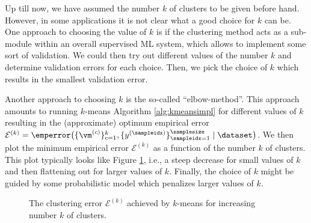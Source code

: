 \documentclass[12pt]{report}
\begin{document}
Up till now, we have assumed the number $k$ of clusters to be given before hand. However, in some 
applications it is not clear what a good choice for $k$ can be. One approach to choosing the value of
$k$ is if the clustering method acts as a sub-module within an overall supervised ML system, which 
allows to implement some sort of validation. We could then try out different values of the number $k$ 
and determine validation errors for each choice. Then, we pick the choice of $k$ which results in the 
smallest validation error. 

Another approach to choosing $k$ is the so-called ``elbow-method''. This approach amounts to running 
$k$-means Algorithm \ref{alg:kmeansimpl} for different values of $k$ resulting in the (approximate) optimum empirical error
$\mathcal{E}^{(k)} = \emperror \big( \{\vm^{(c)}\}_{c=1}^{k},\{y^{(\sampleidx)}\}_{\sampleidx=1}^{\samplesize} \mid \dataset \big)$. 
We then plot the minimum empirical error $\mathcal{E}^{(k)}$ as a function of the number 
$k$ of clusters. This plot typically looks like Figure \ref{fig_ellbow}, i.e., 
a steep decrease for small values of $k$ and then flattening out for larger values of $k$. 
Finally, the choice of $k$ might be guided by some probabilistic model which penalizes 
larger values of $k$. 


\begin{figure}
\begin{center}
\end{center}
\caption{The clustering error $\mathcal{E}^{(k)}$ achieved by $k$-means for increasing number $k$ of clusters.}
\label{fig_ellbow}
\end{figure}
\end{document}

